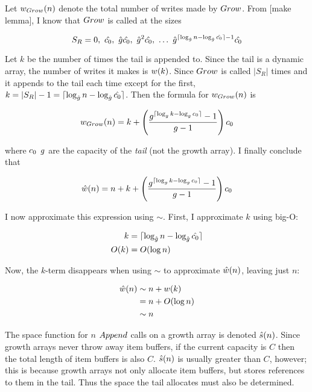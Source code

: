 Let ${w}_{Grow}(n)$ denote the total number of writes made by $Grow$. From [make lemma], I know that $Grow$ is called at the sizes

$$
S_R = 0,\ \VarInitCapacityNew,\ \VarGrowthFactorNew\VarInitCapacityNew,\ \VarGrowthFactorNew^2\VarInitCapacityNew,\ \ldots\ \VarGrowthFactorNew^{\lceil \log_{\VarGrowthFactorNew} n - \log_{\VarGrowthFactorNew} \VarInitCapacityNew \rceil - 1}\VarInitCapacityNew
$$

Let $k$ be the number of times the tail is appended to. Since the tail is a dynamic array, the number of writes it makes is $w(k)$. Since $Grow$ is called $|S_R|$ times and it appends to the tail each time except for the first, $k = |S_R| - 1 = \lceil \log_{\hat{g}} n - \log_{\hat{g}} \hat{c_0} \rceil$. Then the formula for ${w}_{Grow}(n)$ is

$$
{w}_{Grow}(n) = k + \left( \frac{g^{\lceil \log_{g} k - \log_{g} c_0 \rceil} - 1}{g - 1} \right) c_0
$$

where $c_0$ $g$ are the capacity of the \textit{tail} (not the growth array). I finally conclude that

$$
\hat{w}(n) = n + k + \left( \frac{g^{\lceil \log_{g} k - \log_{g} c_0 \rceil} - 1}{g - 1} \right) c_0
$$

I now approximate this expression using $\sim$. First, I approximate $k$ using big-O:

\begin{align*}
k &= \lceil \log_{\hat{g}} n - \log_{\hat{g}} \hat{c_0} \rceil\\
O(k) &= O(\log n)
\end{align*}

Now, the $k$-term disappears when using $\sim$ to approximate $\hat{w}(n)$, leaving just $n$:

\begin{align*}
\hat{w}(n) &\sim n + w(k)\\
&= n + O(\log n)\\
&\sim n
\end{align*}

\HdrSpaceComplex

The space function for $n$ $Append$ calls on a growth array is denoted $\hat{s}(n)$. Since growth arrays never throw away item buffers, if the current capacity is $C$ then the total length of item buffers is also $C$. $\hat{s}(n)$ is usually greater than $C$, however; this is because growth arrays not only allocate item buffers, but stores references to them in the tail. Thus the space the tail allocates must also be determined.


